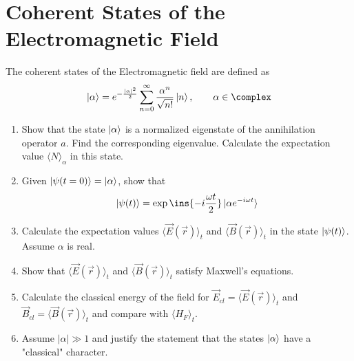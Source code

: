 \clearpage
\section{Coherent States of the Electromagnetic Field}
\begin{colbox}
	The coherent states of the Electromagnetic field are defined as
	\begin{equation}
		\ket{\alpha}=e^{-\frac{\lvert\alpha\rvert^2}{2}}\sum\limits_{n=0}^\infty\frac{\alpha^n}{\sqrt{n!}}\ket{n},\qquad\alpha\in\complex
	\end{equation}
	\begin{enumerate}
		\item Show that the state $\ket{\alpha}$ is a normalized eigenstate of the annihilation operator $a$. Find the corresponding eigenvalue. Calculate the expectation value $\langle N\rangle_\alpha$ in this state.
		\item Given $\ket{\psi(t=0)}=\ket{\alpha}$, show that
		\begin{equation*}
			\ket{\psi(t)}=\exp\ins{-i\frac{\omega t}{2}}\ket{\alpha e^{-i\omega t}}
		\end{equation*}
		\item Calculate the expectation values $\langle \vec E(\vec r)\rangle_t$ and $\langle \vec B(\vec r)\rangle_t$ in the state $\ket{\psi(t)}$. Assume $\alpha$ is real.
		\item Show that $\langle \vec E(\vec r)\rangle_t$ and $\langle \vec B(\vec r)\rangle_t$ satisfy Maxwell's equations.
		\item Calculate the classical energy of the field for $\vec E_{cl}=\langle \vec E(\vec r)\rangle_t$ and $\vec B_{cl}=\langle \vec B(\vec r)\rangle_t$ and compare with $\langle H_F\rangle_t$.
		\item Assume $\lvert\alpha\rvert \gg 1$ and justify the statement that the states $\ket{\alpha}$ have a "classical" character.
	\end{enumerate}
\end{colbox}
